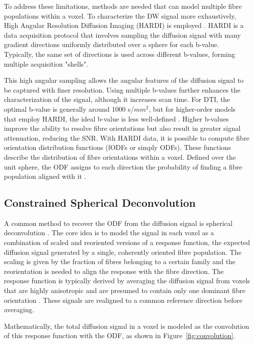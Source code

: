 To address these limitations, methods are needed that can model multiple fibre populations within a voxel. To characterize the DW signal more exhaustively, High Angular Resolution Diffusion Imaging (HARDI) is employed \cite{Descoteaux2015}. HARDI is a data acquisition protocol that involves sampling the diffusion signal with many gradient directions uniformly distributed over a sphere for each b-value. Typically, the same set of directions is used across different b-values, forming multiple acquisition "shells".

This high angular sampling allows the angular features of the diffusion signal to be captured with finer resolution. Using multiple b-values further enhances the characterization of the signal, although it increases scan time. For DTI, the optimal b-value is generally around 1000 s/${mm}^{2}$, but for higher-order models that employ HARDI, the ideal b-value is less well-defined \cite{Mori20148}. Higher b-values improve the ability to resolve fibre orientations but also result in greater signal attenuation, reducing the SNR.
With HARDI data, it is possible to compute fibre orientation distribution functions (fODFs or simply ODFs). These functions describe the distribution of fibre orientations within a voxel. Defined over the unit sphere, the ODF assigns to each direction the probability of finding a fibre population aligned with it \cite{Seunarine2013}.

\subsection{Constrained Spherical Deconvolution}

A common method to recover the ODF from the diffusion signal is spherical deconvolution \cite{DellAcqua2019}. The core idea is to model the signal in each voxel as a combination of scaled and reoriented versions of a response function, the expected diffusion signal generated by a single, coherently oriented fibre population. The scaling is given by the fraction of fibres belonging to a certain family and the reorientation is needed to align the response with the fibre direction. The response function is typically derived by averaging the diffusion signal from voxels that are highly anisotropic and are presumed to contain only one dominant fibre orientation \cite{Tournier2007}. These signals are realigned to a common reference direction before averaging.

Mathematically, the total diffusion signal in a voxel is modeled as the convolution of this response function with the ODF, as shown in Figure~\ref{fig:convolution}.

